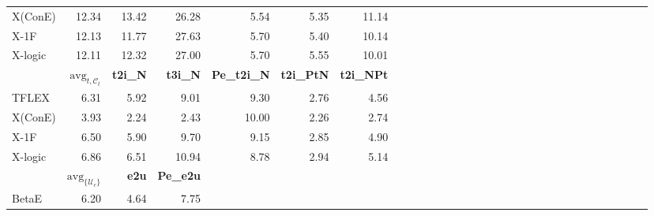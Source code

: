 \begin{table*}
{\begin{tabular}{lrrrrrrrrrrrrrrrrrrrrrrrrrrrrr }
      X(ConE)        & 12.34                            & 13.42            & 26.28            & 5.54                & 5.35              & 11.14                                                                         \\
      X-1F           & 12.13                            & 11.77            & 27.63            & 5.70                & 5.40              & 10.14                                                                         \\
      X-logic        & 12.11                            & 12.32            & 27.00            & 5.70                & 5.55              & 10.01                                                                         \\
      \midrule
      \midrule
                     & $\text{avg}_{t, \mathcal{C}_t}$  & \textbf{t2i\_N}  & \textbf{t3i\_N}  & \textbf{Pe\_t2i\_N} & \textbf{t2i\_PtN} & \textbf{t2i\_NPt}                                                             \\
      \midrule
      TFLEX          & 6.31                             & 5.92             & 9.01             & 9.30                & 2.76              & 4.56                                                                          \\
      X(ConE)        & 3.93                             & 2.24             & 2.43             & 10.00               & 2.26              & 2.74                                                                          \\
      X-1F           & 6.50                             & 5.90             & 9.70             & 9.15                & 2.85              & 4.90                                                                          \\
      X-logic        & 6.86                             & 6.51             & 10.94            & 8.78                & 2.94              & 5.14                                                                          \\
      \midrule
      \midrule
                     & $\text{avg}_{\{\mathcal{U}_e\}}$ & \textbf{e2u}     & \textbf{Pe\_e2u}                                                                                                                           \\
      \midrule
      BetaE          & 6.20                             & 4.64             & 7.75                                                                                                                                       \\

\end{tabular}}
\end{table*}

